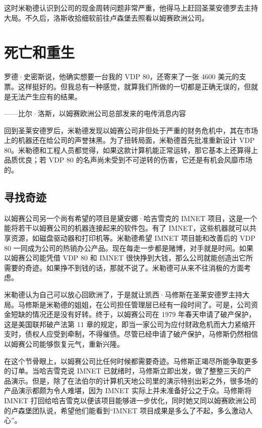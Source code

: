 \documentclass[12pt,UTF8]{ctexbook}
\begin{document}
这时米勒德认识到公司的现金周转问题非常严重，他得马上赶回圣莱安德罗去主持大局。不久后，洛斯收拾细软前往卢森堡去照看以姆赛欧洲公司。





\section{死亡和重生}


罗德·史密斯说，他确实想要一台我的 VDP 80，还寄来了一张 4600 美元的支票。这样挺好的。但我总有一种感觉，就算我们所做的一切都是正确无误的，但就是无法产生应有的结果。

——比尔·洛斯，以姆赛欧洲公司总部发来的电传消息内容



回到圣莱安德罗后，米勒德发现以姆赛公司非但处于严重的财务危机中，其在市场上的机器还在给公司的声誉抹黑。为了扭转局面，米勒德首先批准重新设计 VDP 80。米勒德和工程人员都觉得，如果这款计算机能正常运转，那它基本上还算得上品质优良；若 VDP 80 的名声尚未受到不可逆转的伤害，它还是有机会风靡市场的。





\subsection{寻找奇迹}


以姆赛公司另一个尚有希望的项目是黛安娜·哈吉雪克的 IMNET 项目，这是一个能将若干以姆赛公司的机器连接起来的软件包。有了 IMNET，这些机器就可以共享资源，如磁盘驱动器和打印机等。米勒德希望 IMNET 项目能和改善后的 VDP 80 一同成为公司的热销办公产品。现在每走一步都是赌博，对手就是时间。如果以姆赛公司能凭借 VDP 80 和 IMNET 很快挣到大钱，那么公司就能创造出它所需要的奇迹。如果挣不到钱的话，那就不说了。米勒德可从来不往消极的方面考虑。

米勒德认为自己可以放心回欧洲了，于是就让凯西·马修斯在圣莱安德罗主持大局。马修斯是米勒德的姐姐，在公司担任管理层已经有一段时间了。可是，公司资金短缺的情况还是没有好转。终于，以姆赛公司在 1979 年春天申请了破产保护，这是美国联邦破产法第 11 章的规定，即当一家公司为应付财政危机而大力紧缩开支时，债权人应受到牵制，不得催债。尽管已经申请了破产保护，马修斯仍然相信以姆赛公司能够恢复元气，重新兴隆。

在这个节骨眼上，以姆赛公司比任何时候都需要奇迹。马修斯正竭尽所能争取更多的订单。当哈吉雪克说 IMNET 已就绪时，马修斯立即出发，做了整整三天的产品演示。但是，除了在法伯尔的计算机天地公司里的演示特别出彩之外，很多场的产品演示都颇为令人难堪，因为 IMNET 实际上并未准备好公之于众。马修斯将 IMNET 打回给哈吉雪克以便该项目能够进一步优化，同时她又同以姆赛欧洲公司的卢森堡团队说，希望他们能看到“IMNET 项目成果是多么了不起，多么激动人心”。
\end{document}
